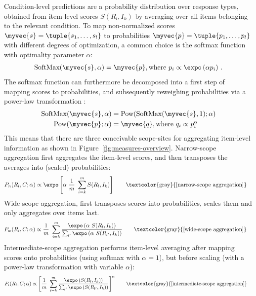 \documentclass[fleqn]{article}
\begin{document}
Condition-level predictions are a probability distribution over response types, obtained from item-level scores $S(R_{l}, I_{k})$ by averaging over all items belonging to the relevant condition.
To map non-normalized scores $\myvec{s} = \tuple{s_{1}, \dots, s_{l}}$ to probabilities $\myvec{p} = \tuple{p_{1}, \dots, p_{l}}$ with different degrees of optimization, a common choice is the softmax function with optimality parameter $\alpha$:
%
\begin{align*}
 \text{SoftMax}(\myvec{s}, \alpha) = \myvec{p}, \text{where } p_{i} \propto \expo \left (\alpha p_{i} \right )\,.
\end{align*}
%
The softmax function can furthermore be decomposed into a first step of mapping scores to probabilities, and subsequently reweighing probabilities via a power-law transformation \citep[c.f.,][]{FrankeDegen2023:The-softmax-fun}:
%
\begin{align*}
  \text{SoftMax}(\myvec{s}, \alpha) & = \text{Pow}( \text{SoftMax}(\myvec{s}, 1) ; \alpha) \\
  \text{Pow}(\myvec{p} ; \alpha) & = \myvec{q}, \text{where } q_{i} \propto p_{i}^{\alpha}
\end{align*}
%
This means that there are three conceivable scope-sites for aggregating item-level information as shown in Figure~\ref{fig:measures-overview}.
Narrow-scope aggregation first aggregates the item-level scores, and then transposes the averages into (scaled) probabilities:
%
\begin{align*}
  & P_{n}(R_{l}, C ; \alpha) \propto \expo \left [  \alpha \ \frac{1}{m} \ \sum_{i = k}^{m} S(R_{l}, I_{k})  \right ]
    \tag*{\textcolor{gray}{[narrow-scope aggregation]}}
\end{align*}
%
Wide-scope aggregation, first transposes scores into probabilities, scales them and only aggregates over items last.
\begin{align*}
  & P_{w}(R_{l}, C ; \alpha) \propto \frac{1}{m} \ \sum_{i = k}^{m} \frac{\expo \left( \alpha \ S(R_{l}, I_{k}) \right )}{ \sum_{l'} \expo \left( \alpha \ S(R_{l'}, I_{k}) \right )}
    \tag*{\textcolor{gray}{[wide-scope aggregation]}}
\end{align*}
%
Intermediate-scope aggregation performs item-level averaging after mapping scores onto probabilities (using softmax with $\alpha=1$), but before scaling (with a power-law transformation with variable $\alpha$):
\begin{align*}
  & P_{i}(R_{l}, C ; \alpha) \propto  \left [ \frac{1}{m} \ \sum_{i = k}^{m} \frac{\expo \left( S(R_{l}, I_{k}) \right )}{ \sum_{l'} \expo \left( S(R_{l'}, I_{k}) \right )} \right ]^{\alpha}
    \tag*{\textcolor{gray}{[intermediate-scope aggregation]}}
\end{align*}
\end{document}
